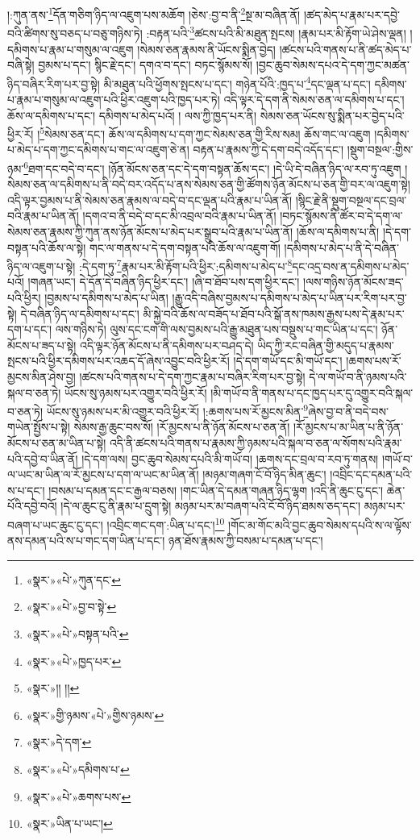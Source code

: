 །:ཀུན་ནས་\footnote{«སྣར་»«པེ་»ཀུན་དང་}དོན་གཅིག་ཉིད་ལ་འཇུག་པས་མཆོག །ཅེས་:བྱ་བ་ནི་\footnote{«སྣར་»«པེ་»བྱ་བ་སྟེ་}སྔ་མ་བཞིན་ནོ། །ཚད་མེད་པ་རྣམ་པར་དབྱེ་བའི་ཚིགས་སུ་བཅད་པ་བཅུ་གཉིས་ཏེ། :བརྟན་པའི་\footnote{«སྣར་»«པེ་»བསྟན་པའི་}ཚངས་པའི་མི་མཐུན་སྤངས། །རྣམ་པར་མི་རྟོག་ཡེ་ཤེས་ལྡན། །དམིགས་པ་རྣམ་པ་གསུམ་ལ་འཇུག །སེམས་ཅན་རྣམས་ནི་ཡོངས་སྨིན་བྱེད། །ཚངས་པའི་གནས་པ་ནི་ཚད་མེད་པ་བཞི་སྟེ། བྱམས་པ་དང་། སྙིང་རྗེ་དང་། དགའ་བ་དང་། བཏང་སྙོམས་སོ། །བྱང་ཆུབ་སེམས་དཔའ་དེ་དག་ཀྱང་མཚན་ཉིད་བཞིར་རིག་པར་བྱ་སྟེ། མི་མཐུན་པའི་ཕྱོགས་སྤངས་པ་དང་། གཉེན་པོའི་:ཁྱད་པ་\footnote{«སྣར་»«པེ་»ཁྱད་པར་}དང་ལྡན་པ་དང་། དམིགས་པ་རྣམ་པ་གསུམ་ལ་འཇུག་པའི་ཕྱིར་འཇུག་པའི་ཁྱད་པར་ཏེ། འདི་ལྟར་དེ་དག་ནི་སེམས་ཅན་ལ་དམིགས་པ་དང་། ཆོས་ལ་དམིགས་པ་དང་། དམིགས་པ་མེད་པའོ། །
ལས་ཀྱི་ཁྱད་པར་ནི། སེམས་ཅན་ཡོངས་སུ་སྨིན་པར་བྱེད་པའི་ཕྱིར་རོ། །\footnote{«སྣར་»།། །།}སེམས་ཅན་དང་། ཆོས་ལ་དམིགས་པ་དག་ཀྱང་སེམས་ཅན་གྱི་རིས་སམ། ཆོས་གང་ལ་འཇུག །དམིགས་པ་མེད་པ་དག་ཀྱང་དམིགས་པ་གང་ལ་འཇུག་ཅེ་ན། བརྟན་པ་རྣམས་ཀྱི་དེ་དག་བདེ་འདོད་དང་། །སྡུག་བསྔལ་:གྱིས་ཉམ་\footnote{«སྣར་»གྱི་ཉམས་«པེ་»གྱིས་ཉམས་}ཐག་དང་བདེ་བ་དང་། །ཉོན་མོངས་ཅན་དང་དེ་དག་བསྟན་ཆོས་དང་། །དེ་ཡི་དེ་བཞིན་ཉིད་ལ་རབ་ཏུ་འཇུག །སེམས་ཅན་ལ་དམིགས་པ་ནི་བདེ་བར་འདོད་པ་ནས་སེམས་ཅན་གྱི་ཚོགས་ཉོན་མོངས་པ་ཅན་གྱི་བར་ལ་འཇུག་སྟེ། འདི་ལྟར་བྱམས་པ་ནི་སེམས་ཅན་རྣམས་ལ་བདེ་བ་དང་ལྡན་པའི་རྣམ་པ་ཡིན་ནོ། །སྙིང་རྗེ་ནི་སྡུག་བསྔལ་དང་བྲལ་བའི་རྣམ་པ་ཡིན་ནོ། །དགའ་བ་ནི་བདེ་བ་དང་མི་འབྲལ་བའི་རྣམ་པ་ཡིན་ནོ། །བཏང་སྙོམས་ནི་ཚོར་བ་དེ་དག་ལ་སེམས་ཅན་རྣམས་ཀྱི་ཀུན་ནས་ཉོན་མོངས་པ་མེད་པར་སྒྲུབ་པའི་རྣམ་པ་ཡིན་ནོ། །ཆོས་ལ་དམིགས་པ་ནི། །དེ་དག་བསྟན་པའི་ཆོས་ལ་སྟེ། གང་ལ་གནས་པ་དེ་དག་བསྟན་པའི་ཆོས་ལ་འཇུག་གོ། །དམིགས་པ་མེད་པ་ནི་དེ་བཞིན་ཉིད་ལ་འཇུག་པ་སྟེ། :དེ་དག་ཏུ་\footnote{«སྣར་»དེ་དག་}རྣམ་པར་མི་རྟོག་པའི་ཕྱིར་:དམིགས་པ་མེད་པ་\footnote{«སྣར་»«པེ་»དམིགས་པ་}དང་འདྲ་བས་ན་དམིགས་པ་མེད་པའོ། །གཞན་ཡང་། དེ་དོན་དེ་བཞིན་ཉིད་ཕྱིར་དང་། །ཞི་བ་ཐོབ་པས་དག་ཕྱིར་དང་། །ལས་གཉིས་ཉོན་མོངས་ཟད་པའི་ཕྱིར། །བྱམས་པ་དམིགས་པ་མེད་པ་ཡིན། །རྒྱུ་འདི་བཞིས་བྱམས་པ་དམིགས་པ་མེད་པ་ཡིན་པར་རིག་པར་བྱ་སྟེ། དེ་བཞིན་ཉིད་ལ་དམིགས་པ་དང་། མི་སྐྱེ་བའི་ཆོས་ལ་བཟོད་པ་ཐོབ་པའི་སྒོ་ནས་ཁམས་རྒྱས་པས་དེ་རྣམ་པར་དག་པ་དང་། ལས་གཉིས་ཏེ། ལུས་དང་ངག་གི་ལས་བྱམས་པའི་རྒྱུ་མཐུན་པས་བསྡུས་པ་གང་ཡིན་པ་དང་། ཉོན་མོངས་པ་ཟད་པ་སྟེ། འདི་ལྟར་ཉོན་མོངས་པ་ནི་དམིགས་པར་བཤད་དེ། ཡིད་ཀྱི་རང་བཞིན་གྱི་མདུད་པ་རྣམས་སྤངས་པའི་ཕྱིར་དམིགས་པར་འཆད་དོ་ཞེས་འབྱུང་བའི་ཕྱིར་རོ། །དེ་དག་གཡོ་དང་མི་གཡོ་དང་། །ཆགས་པས་རོ་མྱངས་མིན་ཤེས་བྱ། །ཚངས་པའི་གནས་པ་དེ་དག་ཀྱང་རྣམ་པ་བཞིར་རིག་པར་བྱ་སྟེ། དེ་ལ་གཡོ་བ་ནི་ཉམས་པའི་སྐལ་བ་ཅན་ཏེ། ཡོངས་སུ་ཉམས་པར་འགྱུར་བའི་ཕྱིར་རོ། །མི་གཡོ་བ་ནི་གནས་པ་དང་ཁྱད་པར་དུ་འགྱུར་བའི་སྐལ་བ་ཅན་ཏེ། ཡོངས་སུ་ཉམས་པར་མི་འགྱུར་བའི་ཕྱིར་རོ། །:ཆགས་པས་རོ་མྱངས་མིན་\footnote{«སྣར་»«པེ་»ཆགས་པས་}ཞེས་བྱ་བ་ནི་བདེ་བས་གཡེན་སྤྱོས་པ་སྟེ། སེམས་རྒྱ་ཆུང་བས་སོ། །རོ་མྱངས་པ་ནི་ཉོན་མོངས་པ་ཅན་ནོ། །རོ་མྱངས་པ་མ་ཡིན་པ་ནི་ཉོན་མོངས་པ་ཅན་མ་ཡིན་པ་སྟེ། འདི་ནི་ཚངས་པའི་གནས་པ་རྣམས་ཀྱི་ཉམས་པའི་སྐལ་བ་ཅན་ལ་སོགས་པའི་རྣམ་པའི་དབྱེ་བ་ཡིན་ནོ། །དེ་དག་ལས། བྱང་ཆུབ་སེམས་དཔའི་མི་གཡོ་བ། །ཆགས་དང་བྲལ་བ་རབ་ཏུ་གནས། །གཡོ་བ་ལ་ཡང་མ་ཡིན་ལ་རོ་མྱངས་པ་དག་ལ་ཡང་མ་ཡིན་ནོ། །མཉམ་གཞག་ངོ་བོ་ཉིད་མིན་ཆུང་། །འབྲིང་དང་དམན་པའི་ས་པ་དང་། །བསམ་པ་དམན་དང་ང་རྒྱལ་བཅས། །གང་ཡིན་དེ་དམན་གཞན་ཉིད་ལྷག །འདི་ནི་ཆུང་ངུ་དང་། ཆེན་པོའི་དབྱེ་བའོ། །དེ་ལ་ཆུང་ངུ་ནི་རྣམ་པ་དྲུག་སྟེ། མཉམ་པར་མ་བཞག་པའི་ངོ་བོ་ཉིད་ཐམས་ཅད་དང་། མཉམ་པར་བཞག་པ་ཡང་ཆུང་ངུ་དང་། །འབྲིང་གང་དག་:ཡིན་པ་དང་།\footnote{«སྣར་»ཡིན་པ་ཡང་།} །གོང་མ་གོང་མའི་བྱང་ཆུབ་སེམས་དཔའི་ས་ལ་ལྟོས་ནས་དམན་པའི་ས་པ་གང་དག་ཡིན་པ་དང་། ཉན་ཐོས་རྣམས་ཀྱི་བསམ་པ་དམན་པ་དང་། 